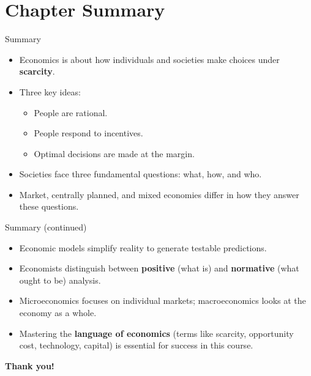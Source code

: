 \documentclass[aspectratio=169]{beamer}
\begin{document}
\section{Chapter Summary}

\begin{frame}{Summary}
\transfade
\begin{itemize}[<+->]
  \item Economics is about how individuals and societies make choices under \textbf{scarcity}.
  \item Three key ideas:
  \begin{itemize}[<+->]
    \item People are rational.
    \item People respond to incentives.
    \item Optimal decisions are made at the margin.
  \end{itemize}
  \item Societies face three fundamental questions: what, how, and who.
  \item Market, centrally planned, and mixed economies differ in how they answer these questions.
\end{itemize}
\end{frame}

\begin{frame}{Summary (continued)}
\transfade
\begin{itemize}[<+->]
  \item Economic models simplify reality to generate testable predictions.
  \item Economists distinguish between \textbf{positive} (what is) and \textbf{normative} (what ought to be) analysis.
  \item Microeconomics focuses on individual markets; macroeconomics looks at the economy as a whole.
  \item Mastering the \textbf{language of economics} (terms like scarcity, opportunity cost, technology, capital) is essential for success in this course.
\end{itemize}
\end{frame}

\begin{frame}
\centering
\Huge \textbf{Thank you!}
\end{frame}
\end{document}
